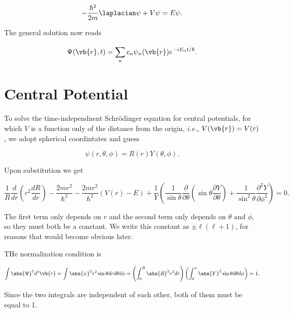 \documentclass[a4paper,12pt]{report}
\begin{document}
\begin{equation}
  -\frac{\hbar ^2}{2m} \laplacian \psi  + V\psi = E\psi .
\end{equation}

The general solution now reads

\begin{equation}
  \Psi (\vb{r} ,t) = \sum_{n}^{} c_{n}\psi _{n}(\vb{r} ) e^{-i E_{n}t/\hbar  }.   
\end{equation}

\section{Central Potential}

To solve the time-independnent Schrödinger equation for central potentials, for which \(V\) is a function only of the distance from the origin, \textit{i.e.,} \(V(\vb{r} ) = V(r)\), we adopt spherical coordintates and guess 

\begin{equation}
  \psi (r,\theta ,\phi ) = R(r) Y (\theta ,\phi ).
\end{equation}

Upon substitution we get

\begin{equation}
  \frac{1}{R}\frac{d}{dr}\left( r^2 \frac{dR}{dr}  \right) - \frac{2mr^2}{\hbar ^2}- \frac{2mr^2}{\hbar ^2}(V(r) - E) + \frac{1}{Y}\left(   \frac{1}{\sin \theta }\frac{\partial }{\partial \theta }\left( \sin \theta  \frac{\partial Y}{\partial \theta } \right) + \frac{1}{\sin ^2\theta }\frac{\partial^2 Y}{\partial \phi ^2} \right) = 0.
\end{equation}

The first term only depends on \(r\) and the second term only depends on \(\theta \text { and } \phi \), so they must both be a constant. We write this constant as \(\pm \ell (\ell +1)\), for reasons that would become obvious later.

THe normalization condition is 

\begin{equation}
  \int \abs{\Psi }^2 d^3 \vb{r} = \int  \abs{\psi }^2r^2\sin \theta dr d\theta d\phi = \left( \int_{0}^{R}  \abs{R}^2r^2dr  \right)\left( \int_{0}^{\pi } \abs{Y}^2\sin \theta d \theta d\phi     \right) = 1.
\end{equation}

Since the two integrals are independent of each other, both of them must be equal to 1.
\end{document}
